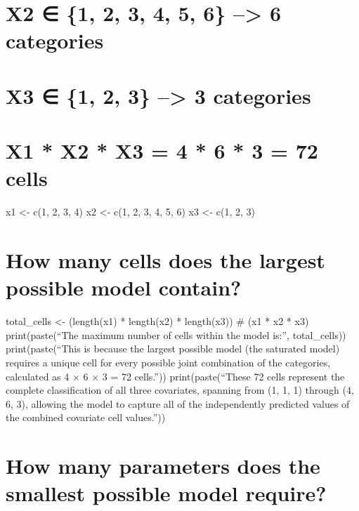 \documentclass[
  letterpaper,
  DIV=11,
  numbers=noendperiod]{scrreprt}
\begin{document}

\chapter{X2 ∈ \{1, 2, 3, 4, 5, 6\} --\textgreater{} 6
categories}\label{x2-1-2-3-4-5-6-6-categories}


\chapter{X3 ∈ \{1, 2, 3\} --\textgreater{} 3
categories}\label{x3-1-2-3-3-categories}


\chapter{X1 * X2 * X3 = 4 * 6 * 3 = 72
cells}\label{x1-x2-x3-4-6-3-72-cells}

x1 \textless- c(1, 2, 3, 4) x2 \textless- c(1, 2, 3, 4, 5, 6) x3
\textless- c(1, 2, 3)


\chapter{How many cells does the largest possible model
contain?}\label{how-many-cells-does-the-largest-possible-model-contain}

total\_cells \textless- (length(x1) * length(x2) * length(x3)) \# (x1 *
x2 * x3) print(paste(``The maximum number of cells within the model
is:'', total\_cells)) print(paste(``This is because the largest possible
model (the saturated model) requires a unique cell for every possible
joint combination of the categories, calculated as 4 × 6 × 3 = 72
cells.'')) print(paste(``These 72 cells represent the complete
classification of all three covariates, spanning from (1, 1, 1) through
(4, 6, 3), allowing the model to capture all of the independently
predicted values of the combined covariate cell values.''))


\chapter{How many parameters does the smallest possible model
require?}\label{how-many-parameters-does-the-smallest-possible-model-require}
\end{document}
